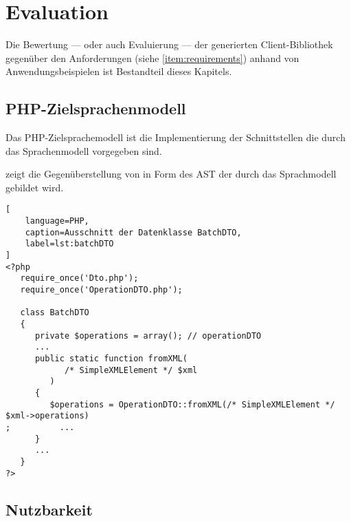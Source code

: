 \chapter{Evaluation}
\label{chap:evaluation}


Die Bewertung --- oder auch Evaluierung --- der generierten Client-Bibliothek gegenüber den Anforderungen (siehe \cref{item:requirements}) anhand von Anwendungsbeispielen ist Bestandteil dieses Kapitels.

\section{PHP-Zielsprachenmodell}\label{sec:php_target_language_model}

Das PHP-Zielsprachemodell ist die Implementierung der Schnittstellen die durch das Sprachenmodell vorgegeben sind.

 zeigt die Gegenüberstellung von  in Form des \gls{AST} der durch das Sprachmodell gebildet wird. 

\begin{minipage}{\textwidth}
\begin{lstlisting}[
    language=PHP,
    caption=Ausschnitt der Datenklasse BatchDTO,
    label=lst:batchDTO
]
<?php
   require_once('Dto.php');
   require_once('OperationDTO.php');

   class BatchDTO
   {
      private $operations = array(); // operationDTO 
      ...
      public static function fromXML(
            /* SimpleXMLElement */ $xml
         )
      {
         $operations = OperationDTO::fromXML(/* SimpleXMLElement */ $xml->operations)
;          ...
      }
      ...
   }
?>
\end{lstlisting}
\end{minipage}

\begin{sidewaysfigure}
    \centering
    \resizebox{\textwidth}{!}{
      
    }
    \caption{Darstellung von BatchDTO aus  im Sprachenmodell [\textbf{Klasse}, \emph{Zeichenkette}]}
    \label{fig:modelRepresentationOfBatchDTO}
\end{sidewaysfigure}

\section{Nutzbarkeit}
\label{sec:usability}

